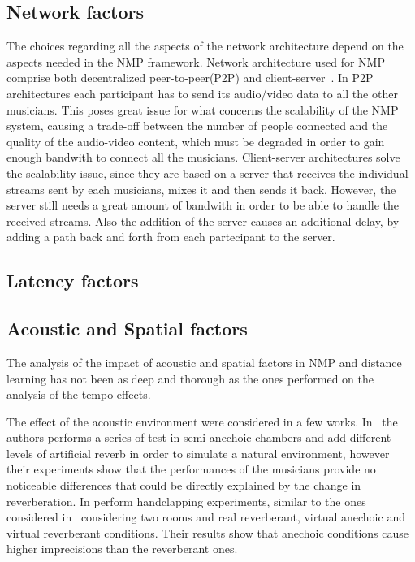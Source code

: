 \subsection{Network factors}
The choices regarding all the aspects of the network architecture depend on the aspects needed in the NMP framework. 
Network architecture used for NMP comprise both decentralized peer-to-peer(P2P) and client-server~\cite{RottondiOverview}. In P2P architectures each participant has to send its audio/video data to all the other musicians. This poses great issue for what concerns the scalability of the NMP system, causing a trade-off between the number of people connected and the quality of the audio-video content, which must be degraded in order to gain enough bandwith to connect all the musicians.
Client-server architectures solve the scalability issue, since they are based on a server that receives the individual streams sent by each musicians, mixes it and then sends it back. However, the server still needs a great amount of bandwith in order to be able to handle the received streams. Also the addition of the server causes an additional delay, by adding a path back and forth from each partecipant to the server.


\subsection{Latency factors}
\subsection{Acoustic and Spatial factors}
The analysis of the impact of acoustic and spatial factors in NMP and distance learning has not been as deep and thorough as the ones performed on the analysis of the tempo effects. 

The effect of the acoustic environment were considered in a few works. In~\cite{carot2009towards} the authors performs a series of test in semi-anechoic chambers and add different levels of artificial reverb in order to simulate a natural environment, however their experiments show that the performances of the musicians provide no noticeable differences that could be directly explained by the change in reverberation. In \cite{FarnerReverb} perform handclapping experiments, similar to the ones considered in~\cite{Chafe1} considering two rooms and real reverberant, virtual anechoic and virtual reverberant conditions. Their results show that anechoic conditions cause higher imprecisions than the reverberant ones.



